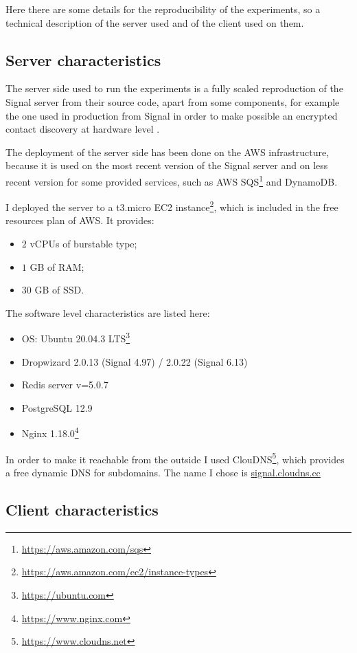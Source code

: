 Here there are some details for the reproducibility of the experiments, so a technical description of the server used and of the client used on them.

\subsection{Server characteristics\label{sec:servercharacteristics}}

The server side used to run the experiments is a fully scaled reproduction of the Signal server from their source code, apart from some components, for example the one used in production from Signal in order to make possible an encrypted contact discovery at hardware level \cite{signal_cds}.

The deployment of the server side has been done on the AWS infrastructure, because it is used on the most recent version of the Signal server and on less recent version for some provided services, such as AWS SQS\footnote{\url{https://aws.amazon.com/sqs}} and DynamoDB.

I deployed the server to a t3.micro EC2 instance\footnote{\url{https://aws.amazon.com/ec2/instance-types}}, which is included in the free resources plan of AWS.
It provides:
\begin{itemize}
    \item $2$ vCPUs of burstable type;
    \item $1$ GB of RAM;
    \item $30$ GB of SSD.
\end{itemize}

The software level characteristics are listed here:
\begin{itemize}
    \item OS: Ubuntu 20.04.3 LTS\footnote{\url{https://ubuntu.com}}
    \item Dropwizard 2.0.13 (Signal 4.97) / 2.0.22 (Signal 6.13)
    \item Redis server v=5.0.7
    \item PostgreSQL 12.9
    \item Nginx 1.18.0\footnote{\url{https://www.nginx.com}}
\end{itemize}

In order to make it reachable from the outside I used ClouDNS\footnote{\url{https://www.cloudns.net}}, which provides a free dynamic DNS for subdomains. The name I chose is \url{signal.cloudns.cc}

\subsection{Client characteristics\label{sec:clientcharacteristics}}

